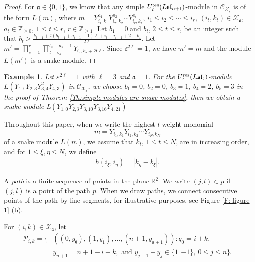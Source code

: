 \documentclass[12pt, reqno]{amsart}
\newtheorem{example}[theorem]{Example}
\numberwithin{equation}{section}
\newcommand{\res}{{\rm res}}
\begin{document}
{\begin{proof}
For $\mathfrak{a} \in \{0,1\}$, we know that any simple $U_{\varepsilon}^{\res}({L\mathfrak{sl}_{n+1}})$-module in $\mathcal{C}_{\mathcal{X}_{\mathfrak{a}}}$ is of the form $L(m)$, where $m=Y_{i_1,k_1}^{a_1}Y_{i_2,k_2}^{a_2} \cdots Y_{i_r,k_r}^{a_r}$, $i_1\leq i_2\leq \cdots \leq i_r$, $(i_t, k_t) \in \mathcal{X}_{\mathfrak{a}}$, $a_t \in \mathbb{Z}_{\geq 0}$, $1\leq t\leq r$, $r\in \mathbb{Z}_{\geq 1}$. Let $b_1=0$ and $b_t$, $2\leq t\leq r$, be an integer such that $b_{t}\geq \frac{k_{t-1}+2(b_{t-1}+a_{t-1}-1) \ell+i_{t}-i_{t-1}+2-k_{t}}{2 \ell}$. Let $m'= \prod_{s=1}^{r} \prod_{t=b_s}^{b_s+a_s-1}Y_{i_s,k_s+2 t\ell}$. Since $\varepsilon^{2 \ell}=1$, we have $m'= m$ and the module $L(m')$ is a snake module.
\end{proof}



\begin{example}
Let $\varepsilon^{2 \ell}=1$ with $\ell=3$ and $\mathfrak{a}=1$. For the $U_{\varepsilon}^{\res}({L\mathfrak{sl}_{5}})$-module $L(Y_{1,0}Y_{2,3}Y_{3,4}^{2}Y_{4,3})$ in $\mathcal{C}_{\mathcal{X}_{\mathfrak{a}}}$, we choose $b_1=0$, $b_2=0$, $b_3=1$, $b_4=2$, $b_5=3$ in the proof of Theorem \ref{Th:simple modules are snake modules}, then we obtain a snake module $L(Y_{1,0}Y_{2,3}Y_{3,10}Y_{3,16}Y_{4,21})$.
\end{example}



Throughout this paper, when we write the highest $l$-weight monomial
\[
m=Y_{i_1,k_1} Y_{i_2,k_2} \cdots Y_{i_N,k_N}
\]
of a snake module $L(m)$, we assume that $k_t$, $1 \leq t \leq N$, are in increasing order, and for $1\leq \xi, \eta \leq N$, we define
\begin{align}\label{Eq:complementing set}
h(i_{\xi},i_{\eta})=|k_{\eta}-k_{\xi}|.
\end{align}


A \textit{path} is a finite sequence of points in the plane $\mathbb{R}^{2}$. We write $(j,l) \in p$ if $(j,l)$ is a point of the path $p$. When we draw paths, we connect consecutive points of the path by line segments, for illustrative purposes, see Figure \ref{F: figure 1} (b).

For $(i,k) \in \mathcal{X}_{\mathfrak{a}}$, let
\begin{align}\label{path}
\mathscr{P}_{i,k}=\{ & ((0,y_{0}),(1,y_{1}),\ldots,(n+1,y_{n+1})): y_{0}=i+k, \nonumber \\
&y_{n+1}=n+1-i+k, \text{ and } y_{j+1}-y_{j}\in \{1,-1\}, \  0\leq j\leq n\}.
\end{align}

}
\end{document}
